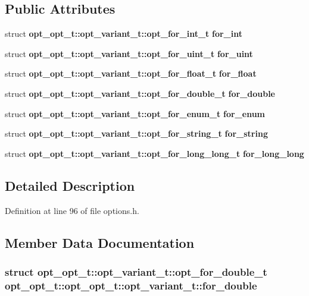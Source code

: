 \subsection*{Public Attributes}
\begin{CompactItemize}
\item 
struct {\bf opt\_\-opt\_\-t::opt\_\-variant\_\-t::opt\_\-for\_\-int\_\-t} {\bf for\_\-int}
\item 
struct {\bf opt\_\-opt\_\-t::opt\_\-variant\_\-t::opt\_\-for\_\-uint\_\-t} {\bf for\_\-uint}
\item 
struct {\bf opt\_\-opt\_\-t::opt\_\-variant\_\-t::opt\_\-for\_\-float\_\-t} {\bf for\_\-float}
\item 
struct {\bf opt\_\-opt\_\-t::opt\_\-variant\_\-t::opt\_\-for\_\-double\_\-t} {\bf for\_\-double}
\item 
struct {\bf opt\_\-opt\_\-t::opt\_\-variant\_\-t::opt\_\-for\_\-enum\_\-t} {\bf for\_\-enum}
\item 
struct {\bf opt\_\-opt\_\-t::opt\_\-variant\_\-t::opt\_\-for\_\-string\_\-t} {\bf for\_\-string}
\item 
struct {\bf opt\_\-opt\_\-t::opt\_\-variant\_\-t::opt\_\-for\_\-long\_\-long\_\-t} {\bf for\_\-long\_\-long}
\end{CompactItemize}


\subsection{Detailed Description}


Definition at line 96 of file options.h.

\subsection{Member Data Documentation}
\subsubsection[{for\_\-double}]{\setlength{\rightskip}{0pt plus 5cm}struct {\bf opt\_\-opt\_\-t::opt\_\-variant\_\-t::opt\_\-for\_\-double\_\-t}  opt\_\-opt\_\-t::opt\_\-opt\_\-t::opt\_\-variant\_\-t::for\_\-double}\label{unionopt__opt__t_1_1opt__variant__t_2c0a60adf1a22a64fbbad9752431e1d1}


